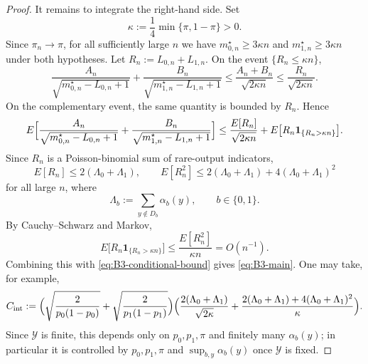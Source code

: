 \documentclass[10pt,a4paper]{amsart}
\begin{document}
\begin{proof}
It remains to integrate the right-hand side. Set
\[
\kappa:=\frac14\min\{\pi,1-\pi\}>0.
\]
Since $\pi_n\to\pi$, for all sufficiently large $n$ we have $m_{0,n}^\star\ge 3\kappa n$ and $m_{1,n}^\star\ge 3\kappa n$ under both hypotheses. Let $R_n:=L_{0,n}+L_{1,n}$. On the event $\{R_n\le \kappa n\}$,
\[
\frac{A_n}{\sqrt{m_{0,n}^\star-L_{0,n}+1}}+\frac{B_n}{\sqrt{m_{1,n}^\star-L_{1,n}+1}}
\le \frac{A_n+B_n}{\sqrt{2\kappa n}}
\le \frac{R_n}{\sqrt{2\kappa n}}.
\]
On the complementary event, the same quantity is bounded by $R_n$. Hence
\[
E\Bigl[\frac{A_n}{\sqrt{m_{0,n}^\star-L_{0,n}+1}}+\frac{B_n}{\sqrt{m_{1,n}^\star-L_{1,n}+1}}\Bigr]
\le \frac{E[R_n]}{\sqrt{2\kappa n}}+E\bigl[R_n\mathbf 1_{\{R_n>\kappa n\}}\bigr].
\]
Since $R_n$ is a Poisson-binomial sum of rare-output indicators,
\[
E[R_n]\le 2(\Lambda_0+\Lambda_1),
\qquad
E[R_n^2]\le 2(\Lambda_0+\Lambda_1)+4(\Lambda_0+\Lambda_1)^2
\]
for all large $n$, where
\[
\Lambda_b:=\sum_{y\notin D_b}\alpha_b(y), \qquad b\in\{0,1\}.
\]
By Cauchy--Schwarz and Markov,
\[
E\bigl[R_n\mathbf 1_{\{R_n>\kappa n\}}\bigr]
\le \frac{E[R_n^2]}{\kappa n}
=O(n^{-1}).
\]
Combining this with \eqref{eq:B3-conditional-bound} gives \eqref{eq:B3-main}. One may take, for example,
\[
C_{\mathrm{int}}
:=\Bigl(\sqrt{\frac{2}{p_0(1-p_0)}}+\sqrt{\frac{2}{p_1(1-p_1)}}\Bigr)
\Bigl(\frac{2(\Lambda_0+\Lambda_1)}{\sqrt{2\kappa}}+\frac{2(\Lambda_0+\Lambda_1)+4(\Lambda_0+\Lambda_1)^2}{\kappa}\Bigr).
\]
Since $\mathcal Y$ is finite, this depends only on $p_0,p_1,\pi$ and finitely many $\alpha_b(y)$; in particular it is controlled by $p_0,p_1,\pi$ and $\sup_{b,y}\alpha_b(y)$ once $\mathcal Y$ is fixed.
\end{proof}
\end{document}
